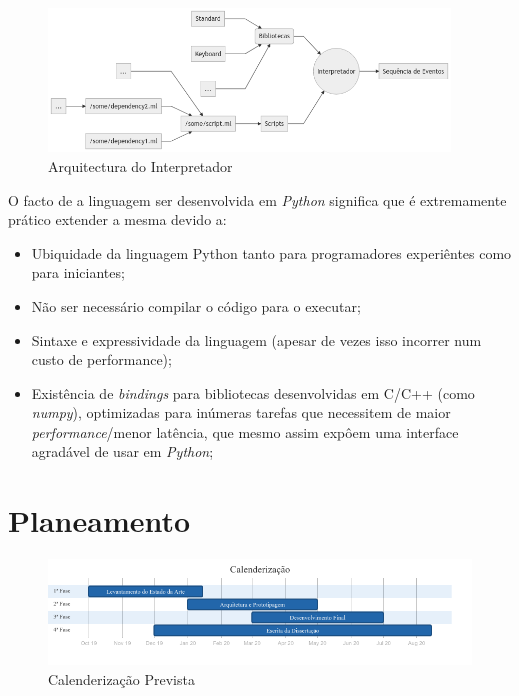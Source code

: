 \documentclass[
  oneside,
  11pt, a4paper,
  footinclude=true,
  headinclude=true,
  cleardoublepage=empty
]{scrbook}
\begin{document}
	
	\begin{figure}[h]
	\begin{center}
		\includegraphics[width=0.95\textwidth]{img/diagram_virtualmachine.png}
	\end{center}
	\caption{Arquitectura do Interpretador}
	\end{figure}
    O facto de a linguagem ser desenvolvida em \textit{Python} significa que é extremamente prático extender a mesma devido a:
    \begin{itemize}
     \item Ubiquidade da linguagem Python tanto para programadores experiêntes como para iniciantes;
     \item Não ser necessário compilar o código para o executar;
     \item Sintaxe e expressividade da linguagem (apesar de vezes isso incorrer num custo de performance);
     \item Existência de \textit{bindings} para bibliotecas desenvolvidas em C/C++ (como \textit{numpy}), optimizadas para inúmeras tarefas que necessitem de maior \textit{performance}/menor latência, que mesmo assim expôem uma interface agradável de usar em \textit{Python};
    \end{itemize}

	\chapter{Planeamento}
	
	\begin{figure}[h]
	\begin{center}
		\includegraphics[width=1\textwidth]{img/diagram_calendarization.png}
	\end{center}
	\caption{Calenderização Prevista}
	\end{figure}
	
\end{document}
